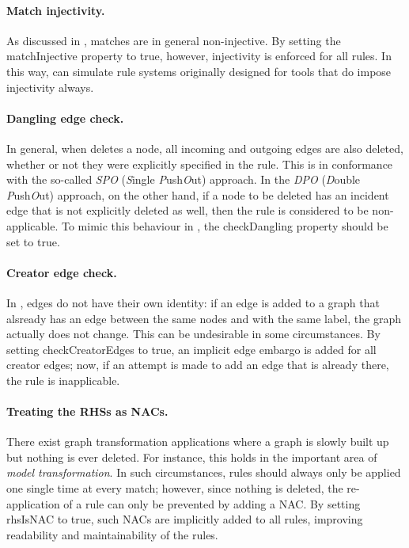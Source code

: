\paragraph{Match injectivity.}

As discussed in , matches are in general non-injective. By
setting the \textsf{matchInjective} property to \textsf{true}, however,
injectivity is enforced for all rules. In this way, \Groove{} can simulate rule
systems originally designed for tools that do impose injectivity always.

\paragraph{Dangling edge check.}

In general, when \Groove{} deletes a node, all incoming and outgoing edges are
also deleted, whether or not they were explicitly specified in the rule. This
is in conformance with the so-called \emph{SPO} (\emph{S}ingle
\emph{P}ush\emph{O}ut) approach. In the \emph{DPO} (\emph{D}ouble
\emph{P}ush\emph{O}ut) approach, on the other hand, if a node to be deleted has
an incident edge that is not explicitly deleted as well, then the rule is
considered to be non-applicable. To mimic this behaviour in \Groove, the
\textsf{checkDangling} property should be set to \textsf{true}.

\paragraph{Creator edge check.}

In \Groove, edges do not have their own identity: if an edge is added to a
graph that alsready has an edge between the same nodes and with the same label,
the graph actually does not change. This can be undesirable in some
circumstances. By setting \textsf{checkCreatorEdges} to \textsf{true}, an
implicit edge embargo is added for all creator edges; now, if an attempt is
made to add an edge that is already there, the rule is inapplicable.

\paragraph{Treating the RHSs as NACs.}

There exist graph transformation applications where a graph is slowly built up
but 
nothing is ever deleted. For instance, this holds in the important area of
\emph{model transformation}. In such circumstances, rules should always only
be applied one single time at every match; however, since nothing is deleted,
the re-application of a rule can only be prevented by adding a NAC. By setting
\textsf{rhsIsNAC} to \textsf{true}, such NACs are implicitly added to all
rules, improving readability and maintainability of the rules.

